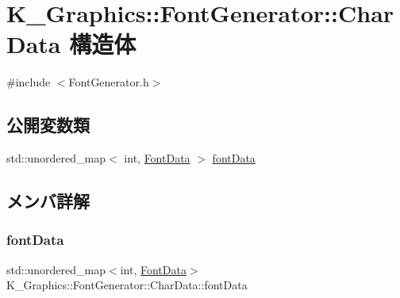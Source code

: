 \hypertarget{struct_k___graphics_1_1_font_generator_1_1_char_data}{}\section{K\+\_\+\+Graphics\+:\+:Font\+Generator\+:\+:Char\+Data 構造体}
\label{struct_k___graphics_1_1_font_generator_1_1_char_data}


{\ttfamily \#include $<$Font\+Generator.\+h$>$}

\subsection*{公開変数類}
\begin{DoxyCompactItemize}
\item 
std\+::unordered\+\_\+map$<$ int, \mbox{\hyperlink{struct_k___graphics_1_1_font_generator_1_1_font_data}{Font\+Data}} $>$ \mbox{\hyperlink{struct_k___graphics_1_1_font_generator_1_1_char_data_aa0c328dbd5a5188198eecb505ca3bed8}{font\+Data}}
\end{DoxyCompactItemize}


\subsection{メンバ詳解}
\mbox{\label{struct_k___graphics_1_1_font_generator_1_1_char_data_aa0c328dbd5a5188198eecb505ca3bed8}} 
\subsubsection{\texorpdfstring{font\+Data}{fontData}}
{\footnotesize\ttfamily std\+::unordered\+\_\+map$<$int, \mbox{\hyperlink{struct_k___graphics_1_1_font_generator_1_1_font_data}{Font\+Data}}$>$ K\+\_\+\+Graphics\+::\+Font\+Generator\+::\+Char\+Data\+::font\+Data}

